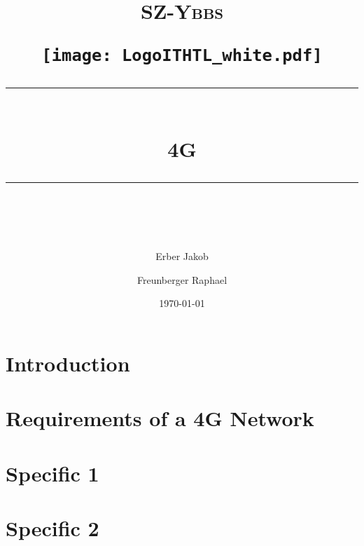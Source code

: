 \documentclass[11pt]{scrartcl} %
\title{	
	\normalfont\normalsize
	\begin{center}
		\begin{minipage}[c]{0.2\textwidth}
			\textsc{\Large SZ-Ybbs}
		\end{minipage}%
		\begin{minipage}[c]{0.1\textwidth}
			\texttt{[image: LogoITHTL\_white.pdf]}
		\end{minipage}
	\end{center}
	\vspace{10pt} %
	\rule{\linewidth}{0.5pt}\\ %
	\vspace{20pt} %
	{\huge 4G}\\ %
	\vspace{12pt} %
	\rule{\linewidth}{2pt}\\ %
	\vspace{12pt} %
}
\author{\LARGE Erber Jakob \and \LARGE Freunberger Raphael} %
\date{\normalsize\today} %
\begin{document}
\maketitle %

\tableofcontents
\clearpage

\section{Introduction}

\section{Requirements of a 4G Network}


\section{Specific 1}

\section{Specific 2}
\end{document}
